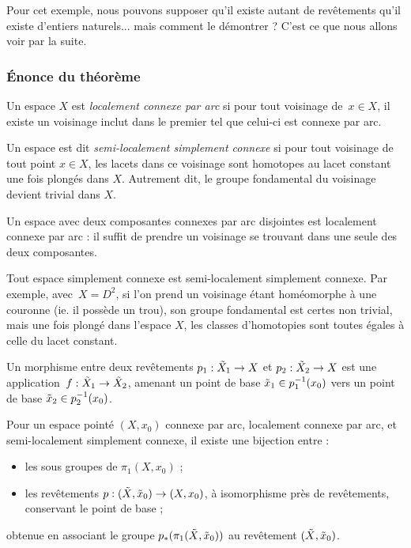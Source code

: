 Pour cet exemple, nous pouvons supposer qu'il existe autant de revêtements qu'il existe d'entiers naturels... mais comment le démontrer ? C'est ce que nous allons voir par la suite.

\subsubsection{Énonce du théorème}

\begin{definition}
Un espace $X$ est \emph{localement connexe par arc} si pour tout voisinage de~$x\in X$, il existe un voisinage inclut dans le premier tel que celui-ci est connexe par arc.

Un espace est dit \emph{semi-localement simplement connexe} si pour tout voisinage de tout point $x\in X$, les lacets dans ce voisinage sont homotopes au lacet constant une fois plongés dans $X$. Autrement dit, le groupe fondamental du voisinage devient trivial dans $X$.
\end{definition}

\begin{exemple}
Un espace avec deux composantes connexes par arc disjointes est localement connexe par arc : il suffit de prendre un voisinage se trouvant dans une seule des deux composantes.

Tout espace simplement connexe est semi-localement simplement connexe. Par exemple, avec~${X=D^2}$, si l'on prend un voisinage étant homéomorphe à une couronne (ie. il possède un trou), son groupe fondamental est certes non trivial, mais une fois plongé dans l'espace $X$, les classes d'homotopies sont toutes égales à celle du lacet constant.
\end{exemple}

Un morphisme entre deux revêtements $p_1:\Tilde{X}_1\to X$ et $p_2:\Tilde{X}_2\to X$ est une application~${f:\Tilde{X}_1\to\Tilde{X}_2}$, amenant un point de base $\Tilde{x}_1\in p_1^{-1}(x_0)$ vers un point de base $\Tilde{x}_2\in p_2^{-1}(x_0)$.

\begin{theorem}
Pour un espace pointé $(X,x_0)$ connexe par arc, localement connexe par arc, et semi-localement simplement connexe, il existe une bijection entre :\begin{itemize}
    \item les sous groupes de $\pi_1(X,x_0)$ ;
    \item les revêtements $p:(\Tilde{X},\Tilde{x}_0)\to(X,x_0)$, à isomorphisme près de revêtements, conservant le point de base ;
\end{itemize} obtenue en associant le groupe $p_\ast(\pi_1(\Tilde{X},\Tilde{x}_0))$ au revêtement $(\Tilde{X},\Tilde{x}_0)$.
\end{theorem}

